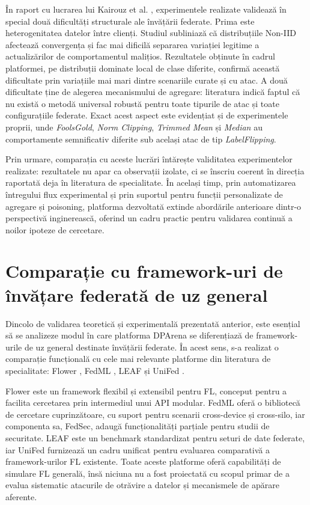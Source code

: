 \documentclass[../../main.tex]{subfiles}
\begin{document}
        În raport cu lucrarea lui Kairouz et al. \cite{kairouz2021federated}, experimentele realizate validează în special două dificultăți structurale ale învățării federate. Prima este heterogenitatea datelor între clienți. Studiul subliniază că distribuțiile Non-IID afectează convergența și fac mai dificilă separarea variației legitime a actualizărilor de comportamentul malițios. Rezultatele obținute în cadrul platformei, pe distribuții dominate local de clase diferite, confirmă această dificultate prin variațiile mai mari dintre scenariile curate și cu atac. A două dificultate ține de alegerea mecanismului de agregare: literatura indică faptul că nu există o metodă universal robustă pentru toate tipurile de atac și toate configurațiile federate. Exact acest aspect este evidențiat și de experimentele proprii, unde \textit{FoolsGold}, \textit{Norm Clipping}, \textit{Trimmed Mean} și \textit{Median} au comportamente semnificativ diferite sub același atac de tip \textit{LabelFlipping}. 

        Prin urmare, comparația cu aceste lucrări întărește validitatea experimentelor realizate: rezultatele nu apar ca observații izolate, ci se înscriu coerent în direcția raportată deja în literatura de specialitate. În același timp, prin automatizarea întregului flux experimental și prin suportul pentru funcții personalizate de agregare și poisoning, platforma dezvoltată extinde abordările anterioare dintr-o perspectivă inginerească, oferind un cadru practic pentru validarea continuă a noilor ipoteze de cercetare.

    \section{Comparație cu framework-uri de învățare federată de uz general}

        Dincolo de validarea teoretică și experimentală prezentată anterior, este esențial să se analizeze modul în care platforma DPArena se diferențiază de framework-urile de uz general destinate învățării federate. În acest sens, s-a realizat o comparație funcțională cu cele mai relevante platforme din literatura de specialitate: Flower \cite{beutel2020flower}, FedML \cite{he2020fedml}, LEAF \cite{caldas2018leaf} și UniFed \cite{liu2022unifed}.

        Flower \cite{beutel2020flower} este un framework flexibil și extensibil pentru FL, conceput pentru a facilita cercetarea prin intermediul unui API modular. FedML \cite{he2020fedml} oferă o bibliotecă de cercetare cuprinzătoare, cu suport pentru scenarii cross-device și cross-silo, iar componenta sa, FedSec, adaugă funcționalități parțiale pentru studii de securitate. LEAF \cite{caldas2018leaf} este un benchmark standardizat pentru seturi de date federate, iar UniFed \cite{liu2022unifed} furnizează un cadru unificat pentru evaluarea comparativă a framework-urilor FL existente. Toate aceste platforme oferă capabilități de simulare FL generală, însă niciuna nu a fost proiectată cu scopul primar de a evalua sistematic atacurile de otrăvire a datelor și mecanismele de apărare aferente.
\end{document}
